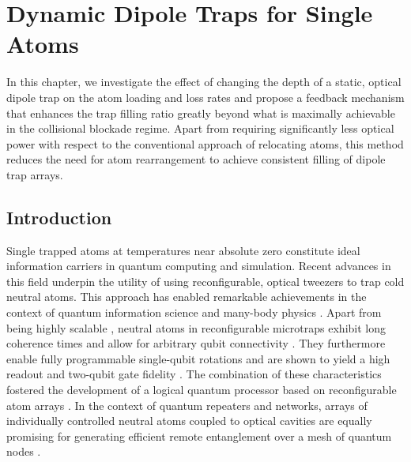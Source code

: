 \documentclass[../Thesis-IJspeert.tex]{subfiles}
\begin{document}
\graphicspath{ {"Dynamic Dipole Traps for Single Atoms/figs/"} }

\chapter{Dynamic Dipole Traps for Single Atoms}
\label{chap:DynamicDipoleTrapsforSingleAtoms}

In this chapter, we investigate the effect of changing the depth of a static, optical dipole trap on the atom loading and loss rates and propose a feedback mechanism that enhances the trap filling ratio greatly beyond what is maximally achievable in the collisional blockade regime. Apart from requiring significantly less optical power with respect to the conventional approach of relocating atoms, this method reduces the need for atom rearrangement to achieve consistent filling of dipole trap arrays. 

\section{Introduction}

Single trapped atoms at temperatures near absolute zero constitute ideal information carriers in quantum computing and simulation. Recent advances in this field underpin the utility of using reconfigurable, optical tweezers to trap cold neutral atoms. This approach has enabled remarkable achievements in the context of quantum information science and many-body physics \cite{Labuhn2016, Endres2016, Bernien2017, Lienhard2018, Barredo2018}. Apart from being highly scalable \cite{Manetsch2024}, neutral atoms in reconfigurable microtraps exhibit long coherence times \cite{Norcia2019,Wu2019,Young2020} and allow for arbitrary qubit connectivity \cite{Beugnon2007,Bluvstein2022}. They furthermore enable fully programmable single-qubit rotations \cite{Ma2023} and are shown to yield a high readout and two-qubit gate fidelity \cite{Evered2023}. The combination of these characteristics fostered the development of a logical quantum processor based on reconfigurable atom arrays \cite{Bluvstein2023}. In the context of quantum repeaters and networks, arrays of individually controlled neutral atoms coupled to optical cavities are equally promising for generating efficient remote entanglement over a mesh of quantum nodes \cite{Wilk2007, rempe2012, Covey2023}. 
\end{document}
